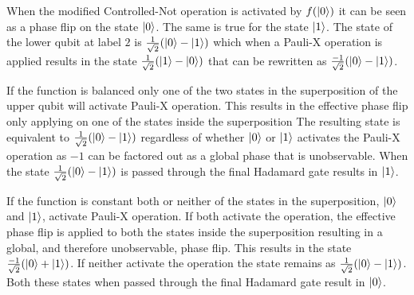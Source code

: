 % 
% 

When the modified Controlled-Not operation is activated by $f(\left\vert{0}\right\rangle)$ it can be seen as a phase flip on the state $\left\vert{0}\right\rangle$.
The same is true for the state $\left\vert{1}\right\rangle$.
The state of the lower qubit at label $2$ is $\frac{1}{\sqrt{2}}(\left\vert{0}\right\rangle-\left\vert{1}\right\rangle)$ which when a Pauli-X operation is applied results in the state $\frac{1}{\sqrt{2}}(\left\vert{1}\right\rangle-\left\vert{0}\right\rangle)$ that can be rewritten as $\frac{-1}{\sqrt{2}}(\left\vert{0}\right\rangle-\left\vert{1}\right\rangle)$.

If the function is balanced only one of the two states in the superposition of the upper qubit will activate Pauli-X operation.
This results in the effective phase flip only applying on one of the states inside the superposition
The resulting state is equivalent to $\frac{1}{\sqrt{2}}(\left\vert{0}\right\rangle-\left\vert{1}\right\rangle)$ regardless of whether $\left\vert{0}\right\rangle$ or $\left\vert{1}\right\rangle$ activates the Pauli-X operation as $-1$ can be factored out as a global phase that is unobservable.
When the state $\frac{1}{\sqrt{2}}(\left\vert{0}\right\rangle-\left\vert{1}\right\rangle)$ is passed through the final Hadamard gate results in $\left\vert{1}\right\rangle$.

If the function is constant both or neither of the states in the superposition, $\left\vert{0}\right\rangle$ and $\left\vert{1}\right\rangle$, activate Pauli-X operation.
If both activate the operation, the effective phase flip is applied to both the states inside the superposition resulting in a global, and therefore unobservable, phase flip.
This results in the state $\frac{-1}{\sqrt{2}}(\left\vert{0}\right\rangle+\left\vert{1}\right\rangle)$.
If neither activate the operation the state remains as $\frac{1}{\sqrt{2}}(\left\vert{0}\right\rangle-\left\vert{1}\right\rangle)$.
Both these states when passed through the final Hadamard gate result in $\left\vert{0}\right\rangle$.

